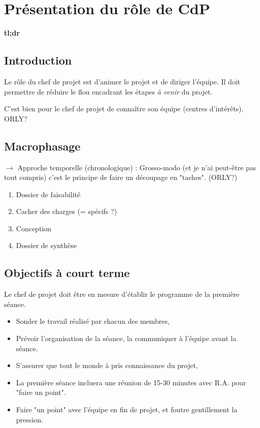 \chapter{Présentation du rôle de CdP}

\textbf{tl;dr}

\section{Introduction}

Le rôle du chef de projet est d'animer le projet et de diriger l'équipe. Il
doit permettre de réduire le flou encadrant les étapes \textit{à venir} du
projet.

C'est bien pour le chef de projet de connaître son équipe (centres d'intérêts).
ORLY?

\section{Macrophasage}

$\rightarrow$ Approche temporelle (chronologique) : Grosso-modo (et je n'ai
peut-être pas tout compris) c'est le principe de faire un découpage en
"taches". (ORLY?)

\begin{enumerate}
	\item Dossier de faisabilité
	\item Cacher des charges (= spécifs ?)
	\item Conception
	\item Dossier de synthèse
\end{enumerate}

\section{Objectifs à court terme}

Le chef de projet doit être en mesure d'établir le programme de la première
séance.

\begin{itemize}
	\item Sonder le travail réalisé par chacun des membres,
	\item Prévoir l'organisation de la séance, la communiquer à l'équipe avant
la séance.
	\item S'assurer que tout le monde à pris connaissance du projet,
	\item La première séance incluera une réunion de 15-30 minutes avec R.A.
pour "faire un point".
	\item Faire "un point" avec l'équipe en fin de projet, et foutre
gentillement la pression.
\end{itemize}

